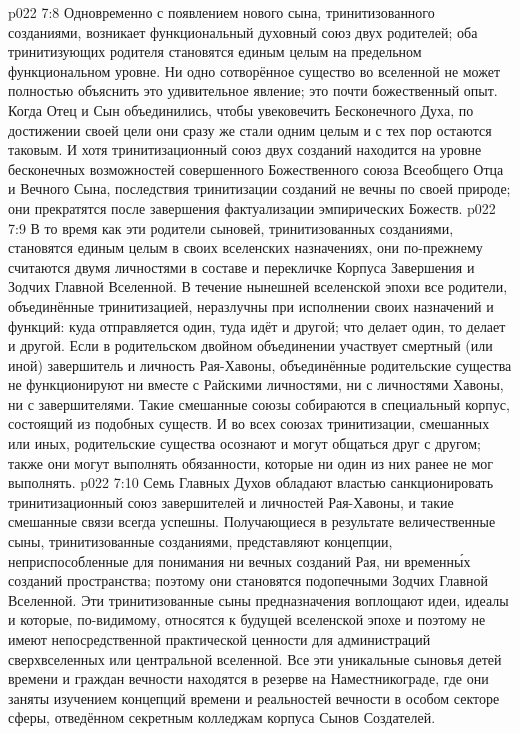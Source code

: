 \vs p022 7:8 Одновременно с появлением нового сына, тринитизованного созданиями, возникает функциональный духовный союз двух родителей; оба тринитизующих родителя становятся единым целым на предельном функциональном уровне. Ни одно сотворённое существо во вселенной не может полностью объяснить это удивительное явление; это почти божественный опыт. Когда Отец и Сын объединились, чтобы увековечить Бесконечного Духа, по достижении своей цели они сразу же стали одним целым и с тех пор остаются таковым. И хотя тринитизационный союз двух созданий находится на уровне бесконечных возможностей совершенного Божественного союза Всеобщего Отца и Вечного Сына, последствия тринитизации созданий не вечны по своей природе; они прекратятся после завершения фактуализации эмпирических Божеств.
\vs p022 7:9 В то время как эти родители сыновей, тринитизованных созданиями, становятся единым целым в своих вселенских назначениях, они по\hyp{}прежнему считаются двумя личностями в составе и перекличке Корпуса Завершения и Зодчих Главной Вселенной. В течение нынешней вселенской эпохи все родители, объединённые тринитизацией, неразлучны при исполнении своих назначений и функций: куда отправляется один, туда идёт и другой; что делает один, то делает и другой. Если в родительском двойном объединении участвует смертный (или иной) завершитель и личность Рая\hyp{}Хавоны, объединённые родительские существа не функционируют ни вместе с Райскими личностями, ни с личностями Хавоны, ни с завершителями. Такие смешанные союзы собираются в специальный корпус, состоящий из подобных существ. И во всех союзах тринитизации, смешанных или иных, родительские существа осознают и могут общаться друг с другом; также они могут выполнять обязанности, которые ни один из них ранее не мог выполнять.
\vs p022 7:10 \pc Семь Главных Духов обладают властью санкционировать тринитизационный союз завершителей и личностей Рая\hyp{}Хавоны, и такие смешанные связи всегда успешны. Получающиеся в результате величественные сыны, тринитизованные созданиями, представляют концепции, неприспособленные для понимания ни вечных созданий Рая, ни временн\'ых созданий пространства; поэтому они становятся подопечными Зодчих Главной Вселенной. Эти тринитизованные сыны предназначения воплощают идеи, идеалы и  которые, по\hyp{}видимому, относятся к будущей вселенской эпохе и поэтому не имеют непосредственной практической ценности для администраций сверхвселенных или центральной вселенной. Все эти уникальные сыновья детей времени и граждан вечности находятся в резерве на Наместникограде, где они заняты изучением концепций времени и реальностей вечности в особом секторе сферы, отведённом секретным колледжам корпуса Сынов Создателей.
